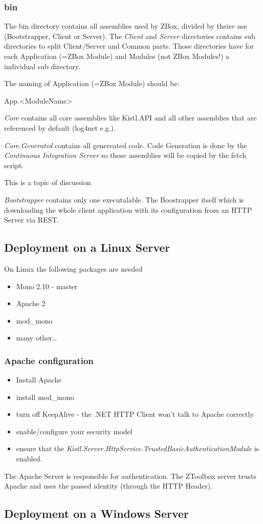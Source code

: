 \subsubsection{bin}
The bin directory contains all assemblies used by ZBox, divided by theire use
(Bootstrapper, Client or Server). The \emph{Client} and \emph{Server}
directories contains sub directories to split Client/Server and Common parts.
Those directories have for each Application (=ZBox Module) and Modules (not ZBox
Modules!) a individual sub directory.

The naming of Application (=ZBox Module) should be:

\begin{center}
App.\textless ModuleName\textgreater  
\end{center}

\emph{Core} contains all core assemblies like Kistl.API and all other
assemblies that are referenced by default (log4net e.g.).

\emph{Core.Generated} contains all genereated code. Code Generation is done by
the \emph{Continuous Integration Server} so those assemblies will be copied by
the fetch script.

\begin{note}
This is a topic of discussion
\end{note}

\emph{Bootstrapper} contains only one executalable. The Boostrapper itself which
is downloading the whole client application with its configuration from an HTTP
Server via REST.

\subsection{Deployment on a Linux Server}

On Linux the following packages are needed

\begin{itemize}
  \item Mono 2.10 - master
  \item Apache 2
  \item mod\_mono
  \item many other\ldots
 \end{itemize}

\subsubsection{Apache configuration}

\begin{itemize}
\item Install Apache
\item install mod\_mono
\item turn off KeepAlive - the .NET HTTP Client won't talk to Apache correctly 
\item enable/configure your security model
\item ensure that the
\emph{Kistl.Server.HttpService.TrustedBasicAuthenticationModule} is enabled.
\end{itemize}

The Apache Server is responsible for authentication. The ZToolbox server trusts
Apache and uses the passed identity (through the HTTP Header).
 

\subsection{Deployment on a Windows Server}
